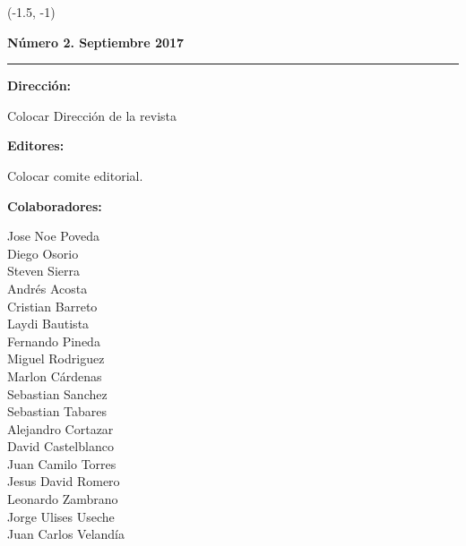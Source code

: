 \begin{textblock}{30}(-1.5, -1)
\begin{minipage}{0.12\linewidth}
\sf\color{barcolor}
\begin{center}

\vspace{1cm}

\colorbox{black}{
{\resizebox{3cm}{0.7cm}{\textcolor{white}{\bf\sf\large GLUD}}}
}
{\resizebox{2.5cm}{0.4cm}{\textcolor{white}{\bf\sf\large Magazine}}}

\vspace{4mm}

{\bf Número 2. Septiembre 2017}

\vspace{2cm}
\hrule

\vspace{4mm}

{\bf Dirección: }

\vspace{1mm}

Colocar Dirección de la revista

\vspace{2mm}

{\bf Editores:}

\vspace{1mm}

Colocar comite editorial.

\vspace{4mm}

{\bf Colaboradores:}

\vspace{1mm}


Jose Noe Poveda\\
Diego Osorio\\
Steven Sierra\\
Andrés Acosta\\
Cristian Barreto\\
Laydi Bautista\\
Fernando Pineda\\
Miguel Rodriguez\\
Marlon Cárdenas\\
Sebastian Sanchez\\
Sebastian Tabares\\
Alejandro Cortazar\\
David Castelblanco\\
Juan Camilo Torres\\
Jesus David Romero\\
Leonardo Zambrano\\
Jorge Ulises Useche\\
Juan Carlos Velandía



\end{center}
\end{minipage}
\end{textblock}

